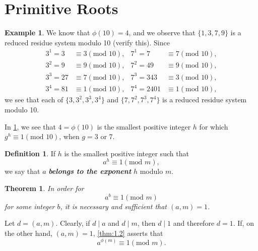 \documentclass{article}
\makeatletter
\newtheorem{theorem}{Theorem}[section]
\theoremstyle{definition}
\newtheorem{definition}{Definition}[section]
\theoremstyle{remark}
\let\oldproofname=\proofname
\renewcommand{\proofname}{\textit{\oldproofname}}
\theoremstyle{definition}
\newtheorem{example}{Example}[section]
\renewenvironment{proof}[1][\proofname]{\par
  \pushQED{\qed}%
  \normalfont \topsep6\p@\@plus6\p@\relax
  \list{}{\leftmargin=0mm
          \rightmargin=0mm
          \settowidth{\itemindent}{\itshape#1}%
          \labelwidth=\itemindent
          \parsep=0pt \listparindent=0mm%
  }
  \item[\hskip\labelsep
        \itshape
    #1\@addpunct{.}]\ignorespaces
}{%
  \popQED\endlist\@endpefalse
}
\makeatother
\begin{document}
\section{Primitive Roots}
    \begin{example}\label{ex:2.1}
        We know that $\phi(10)=4$, and we observe that $\{1,3,7,9\}$ is a reduced residue system modulo 10 (verify this). Since
            \begin{align*}
                3^1=3&\equiv3(\text{mod }10),  & 7^1=7&\equiv 7(\text{mod }10), \\
                3^2=9&\equiv 9(\text{mod }10), & 7^2=49&\equiv9(\text{mod }10),\\
                3^3=27&\equiv7(\text{mod }10), & 7^3=343&\equiv3(\text{mod }10), \\
                3^4=81&\equiv1(\text{mod }10), & 7^4=2401&\equiv1(\text{mod }10),
            \end{align*}
        we see that each of $\{3,3^2,3^3,3^4\}$ and $\{7,7^2,7^3,7^4\}$ is a reduced residue system modulo 10.
    \end{example}
    In \cref{ex:2.1}, we see that $4=\phi(10)$ is the smallest positive integer $h$ for which $g^h\equiv 1(\text{mod }10)$, when $g=3$ or 7.
    \begin{definition}\label{def:2.1}
        If $h$ is the smallest positive integer such that 
            \begin{equation*}
                a^h\equiv1(\text{mod }m),
            \end{equation*}
        we say that $a$ \textbf{\textit{belongs to the exponent}} $h$ modulo $m$.
    \end{definition}
    \begin{theorem}\label{thm:2.1}
        In order for 
            \begin{equation*}
                a^b\equiv 1(\text{mod }m)
            \end{equation*}
        for some integer $b$, it is necessary and sufficient that $(a,m)=1$.
    \end{theorem}
        \begin{proof}
                Let $d=(a,m)$. Clearly, if $d\mid a$ and $d\mid m$, then $d\mid 1$ and therefore $d=1$. If, on the other hand, $(a,m)=1$, \cref{thm:1.2} asserts that 
                    \begin{equation*}
                        a^{\phi(m)}\equiv 1(\text{mod }m).
                    \end{equation*}
            \end{proof}
\end{document}
